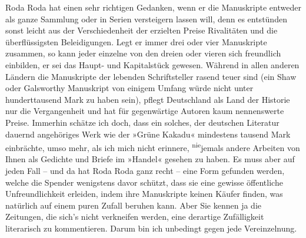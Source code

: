\pstart
           Roda Roda hat einen sehr richtigen Gedanken,
               wenn er die Manuskripte entweder als ganze Sammlung oder in Serien versteigern lassen
               will, denn es entstünden sonst leicht aus der Verschiedenheit der erzielten Preise
               Rivalitäten und die überflüssigsten Beleidigungen. Legt er immer drei oder vier
               Manuskripte zusammen, so kann jeder einzelne von den dreien oder vieren sich
               freundlich einbilden, er sei das Haupt- und Kapitalstück gewesen. Während in allen
               anderen Ländern die Manuskripte der lebenden Schriftsteller rasend teuer sind (ein
                  Shaw oder Galsworthy Manuskript von einigem Umfang würde nicht unter hunderttausend
               Mark zu haben sein), pflegt Deutschland als Land
               der Historie nur die Vergangenheit und hat für gegenwärtige Autoren kaum nennenswerte
               Preise. Immerhin schätze ich doch, dass ein solches, der deutschen Literatur dauernd angehöriges Werk wie der »Grüne Kakadu« mindestens  tausend Mark einbrächte, umso mehr, als ich mich
               nicht erinnere, \substVorne{}\textsuperscript{nie}\substDazwischen{}je\substHinten{}mals andere Arbeiten von Ihnen als Gedichte und Briefe im »Handel« gesehen zu
               haben. Es muss aber auf jeden Fall – und da hat Roda
                  Roda ganz recht – eine Form gefunden werden, {\pb}welche die Spender wenigstens davor
               schützt, dass sie eine gewisse öffentliche Unfreundlichkeit erleiden, indem ihre
               Manuskripte keinen Käufer finden, was natürlich auf einem puren Zufall beruhen kann.
               Aber Sie kennen ja die Zeitungen, die sich’s nicht verkneifen werden, eine derartige
               Zufälligkeit literarisch zu kommentieren. Darum bin ich unbedingt gegen jede
               Vereinzelnung.\pend
           
